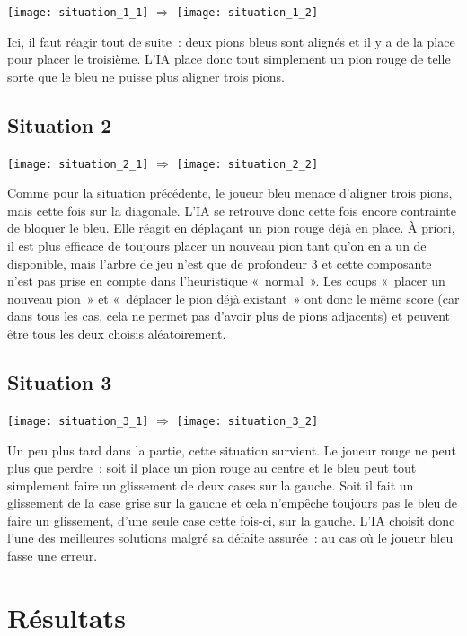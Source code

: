 \texttt{[image: situation\_1\_1]}{}
\(\Rightarrow\)
\texttt{[image: situation\_1\_2]}{}

Ici, il faut réagir tout de suite : deux pions bleus sont alignés et il y a de la place pour placer le troisième.
L'IA place donc tout simplement un pion rouge de telle sorte que le bleu ne puisse plus aligner trois pions.

\subsection{Situation 2}

\texttt{[image: situation\_2\_1]}{}
\(\Rightarrow\)
\texttt{[image: situation\_2\_2]}{}

Comme pour la situation précédente, le joueur bleu menace d'aligner trois pions, mais cette fois sur la diagonale.
L'IA se retrouve donc cette fois encore contrainte de bloquer le bleu. Elle réagit en déplaçant un pion rouge déjà en
place. À priori, il est plus efficace de toujours placer un nouveau pion tant qu'on en a un de disponible, mais l'arbre
de jeu n'est que de profondeur 3 et cette composante n'est pas prise en compte dans l'heuristique « normal ». Les coups « placer
un nouveau pion » et « déplacer le pion déjà existant » ont donc le même score (car dans tous les cas, cela ne permet pas
d'avoir plus de pions adjacents) et peuvent être tous les deux choisis aléatoirement.

\subsection{Situation 3}

\texttt{[image: situation\_3\_1]}{}
\(\Rightarrow\)
\texttt{[image: situation\_3\_2]}{}

Un peu plus tard dans la partie, cette situation survient. Le joueur rouge ne peut plus que perdre : soit il place un pion
rouge au centre et le bleu peut tout simplement faire un glissement de deux cases sur la gauche. Soit il fait un glissement
de la case grise sur la gauche et cela n'empêche toujours pas le bleu de faire un glissement, d'une seule case cette fois-ci, sur
la gauche. L'IA choisit donc l'une des meilleures solutions malgré sa défaite assurée : au cas où le joueur bleu fasse une erreur.

\section{Résultats}

